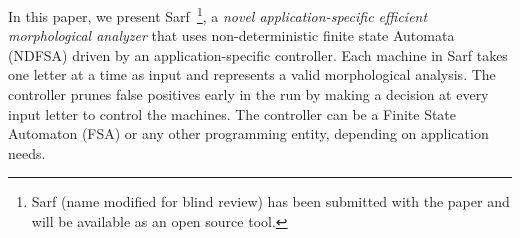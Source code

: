 \documentclass[11pt]{article}
\begin{document}
In this paper, we present Sarf~\footnote{Sarf (name modified for blind review) 
has been submitted with the paper and will be available 
as an open source tool.}, 
a {\em novel application-specific efficient 
morphological analyzer} that uses 
non-deterministic finite state Automata (NDFSA)
driven by an application-specific controller.
Each machine in Sarf takes one letter at a time as input
and represents a valid morphological analysis.
The controller prunes false positives
early in the run by making a decision at every input letter
to control the machines.
The controller can be a Finite State Automaton (FSA) or any other %
programming entity, %
depending on application needs.
\end{document}
